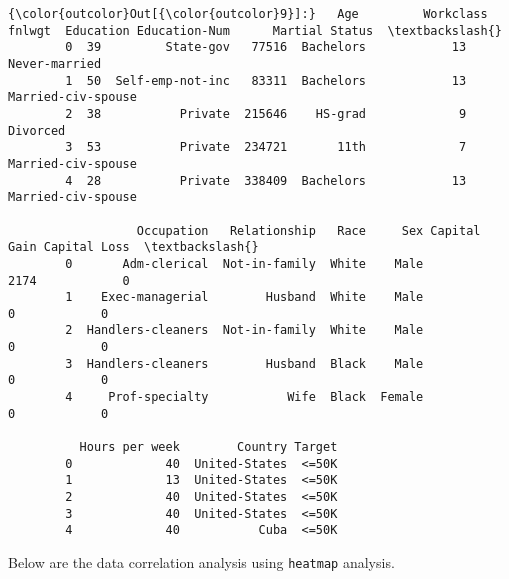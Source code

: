 \documentclass[11pt]{article}
\begin{document}
\begin{Verbatim}[commandchars=\\\{\}]
{\color{outcolor}Out[{\color{outcolor}9}]:}   Age         Workclass  fnlwgt  Education Education-Num      Martial Status  \textbackslash{}
        0  39         State-gov   77516  Bachelors            13       Never-married   
        1  50  Self-emp-not-inc   83311  Bachelors            13  Married-civ-spouse   
        2  38           Private  215646    HS-grad             9            Divorced   
        3  53           Private  234721       11th             7  Married-civ-spouse   
        4  28           Private  338409  Bachelors            13  Married-civ-spouse   
        
                  Occupation   Relationship   Race     Sex Capital Gain Capital Loss  \textbackslash{}
        0       Adm-clerical  Not-in-family  White    Male         2174            0   
        1    Exec-managerial        Husband  White    Male            0            0   
        2  Handlers-cleaners  Not-in-family  White    Male            0            0   
        3  Handlers-cleaners        Husband  Black    Male            0            0   
        4     Prof-specialty           Wife  Black  Female            0            0   
        
          Hours per week        Country Target  
        0             40  United-States  <=50K  
        1             13  United-States  <=50K  
        2             40  United-States  <=50K  
        3             40  United-States  <=50K  
        4             40           Cuba  <=50K  
\end{Verbatim}
            
    Below are the data correlation analysis using \texttt{heatmap} analysis.
\end{document}
